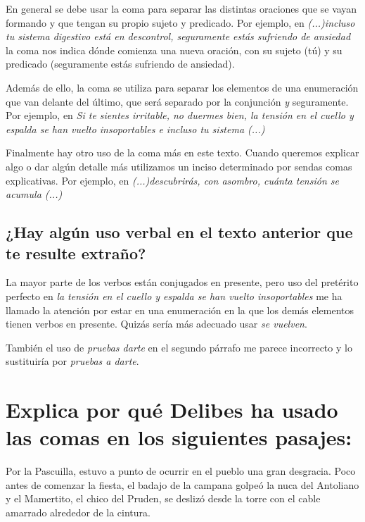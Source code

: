 \documentclass[12pt, a4paper, oneside]{report}
\begin{document}
        En general se debe usar la coma para separar las distintas oraciones que se vayan formando y que
        tengan su propio sujeto y predicado. Por ejemplo, en \textit{(...)incluso tu sistema digestivo está en
        descontrol, seguramente estás sufriendo de ansiedad} la coma nos indica dónde comienza una nueva
        oración, con su sujeto (tú) y su predicado (seguramente estás sufriendo de ansiedad).

        Además de ello, la coma se utiliza para separar los elementos de una enumeración que van delante
        del último, que será separado por la conjunción \textit{y} seguramente. Por ejemplo, en \textit{Si te
        sientes irritable, no duermes bien, la tensión en el cuello y espalda se han vuelto insoportables e
        incluso tu sistema (...)}

        Finalmente hay otro uso de la coma más en este texto. Cuando queremos explicar algo o dar algún
        detalle más utilizamos un inciso determinado por sendas comas explicativas. Por ejemplo, en
        \textit{(...)descubrirás, con asombro, cuánta tensión se acumula (...)}

        \subsection*{¿Hay algún uso verbal en el texto anterior que te resulte extraño?}
            La mayor parte de los verbos están conjugados en presente, pero uso del pretérito perfecto en
            \textit{la tensión en el cuello y espalda se han vuelto insoportables} me ha llamado la atención
            por estar en una enumeración en la que los demás elementos tienen verbos en presente. Quizás
            sería más adecuado usar \textit{se vuelven}.

            También el uso de \textit{pruebas darte} en el segundo párrafo me parece incorrecto y lo
            sustituiría por \textit{pruebas a darte}.

    \section{Explica por qué Delibes ha usado las comas en los siguientes pasajes:}
        Por la Pascuilla, estuvo a punto de ocurrir en el pueblo una gran desgracia. Poco antes de comenzar la
        fiesta, el badajo de la campana golpeó la nuca del Antoliano y el Mamertito, el chico del Pruden, se
        deslizó desde la torre con el cable amarrado alrededor de la cintura.
\end{document}

